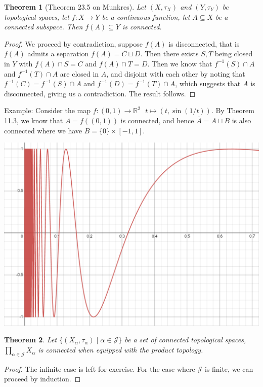 \documentclass[11pt]{book}
\theoremstyle{break}
\theoremstyle{break}
\newtheorem{thm}{Theorem}[section]
\newcommand{\R}{\mathbb{R}}
\newcommand{\example}{\color{green}Example: \color{black}}
\begin{document}
\begin{thm}[Theorem 23.5 on Munkres]
Let $(X,\tau_X)$ and $(Y,\tau_Y)$ be topological spaces, let $f:X \to Y$ be a continuous function, let $A\subseteq X$ be a connected subspace. Then $f(A) \subseteq Y$ is connected.
\end{thm}
\begin{proof}
We proceed by contradiction, suppose $f(A)$ is disconnected, that is $f(A)$ admits a separation $f(A) = C\sqcup D$. Then there exists $S,T$ being closed in $Y$ with $f(A) \cap S = C$ and $f(A) \cap T = D$. Then we know that $f^{-1}(S) \cap A$ and $f^{-1}(T)\cap A$ are closed in $A$, and disjoint with each other by noting that $f^{-1}(C) = f^{-1}(S)\cap A$ and $f^{-1}(D) = f^{-1}(T)\cap A$, which suggests that $A$ is disconnected, giving us a contradiction. The result follows. 
\end{proof}


\example Consider the map $f:(0,1) \to \R^2 \ \ \ t\mapsto (t,\sin(1/t))$. By Theorem 11.3, we know that $A = f((0,1))$ is connected, and hence $\bar{A} = A\sqcup B$ is also connected where we have $B =\{0\}\times [-1,1]$. 
\begin{center}
\includegraphics[scale=0.5]{sin.png}
\end{center}


\begin{thm}
Let $\{(X_\alpha,\tau_\alpha) \mid \alpha \in \mathcal{J}\}$ be a set of connected topological spaces, $\prod_{\alpha \in \mathcal{J}}X_\alpha$ is connected when equipped with the product topology. 
\end{thm}
\begin{proof}
The infinite case is left for exercise. For the case where $\mathcal{J}$ is finite, we can proceed by induction.
\end{proof}
\end{document}
